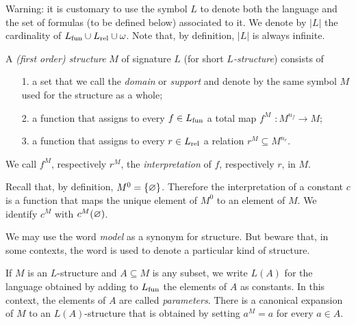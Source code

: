Warning: it is customary to use the symbol \emph{$L$} to denote both the language and the set of formulas (to be defined below) associated to it. We denote by \emph{$|L|$} the cardinality of $L_{\rm fun}\cup L_{\rm rel}\cup\omega$. Note that, by definition, $|L|$ is always infinite. 

A \emph{(first order) structure\/} $M$ of signature $L$ (for short \emph{$L$-structure}) consists of

\begin{itemize}
\item[1.] a set that we call the \emph{domain\/} or \emph{support} and denote by the same symbol $M$ used for the structure as a whole;
\item[2.] a function that assigns to every $f\in L_{\rm fun}$ a total map \emph{$f^M$ $: M^{n_f}\to M$};
\item[3.] a function that assigns to every  $r\in L_{\rm rel}$ a relation \emph{$r^M\subseteq M^{n_r}$}.
\end{itemize}
 We call $f^M$, respectively $r^M$, the \emph{interpretation\/} of $f$, respectively $r$, in $M$.
 
Recall that, by definition, $M^0=\{\varnothing\}$. Therefore the interpretation of a constant $c$ is a function that maps the unique element of $M^0$ to an element of $M$. We identify \emph{$c^M$\/} with $c^M(\varnothing)$.

We may use the word \emph{model\/} as a synonym for structure. But beware that, in some contexts, the word is used to denote a particular kind of structure.  

If $M$ is an $L$-structure and $A\subseteq M$ is any subset, we write \emph{$L(A)$\/} for  the language obtained by  adding to $L_{\rm fun}$ the elements of $A$ as constants. In this context, the elements of $A$ are called \emph{parameters}. There is a canonical expansion of $M$ to an $L(A)$-structure that is obtained by setting $a^M=a$ for every $a\in A$.

